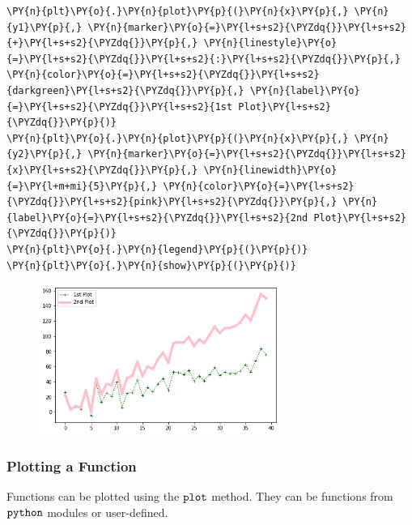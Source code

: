 \begin{tcolorbox}[breakable, size=fbox, boxrule=1pt, pad at break*=1mm,colback=cellbackground, colframe=cellborder]
\begin{Verbatim}[commandchars=\\\{\}]
\PY{n}{plt}\PY{o}{.}\PY{n}{plot}\PY{p}{(}\PY{n}{x}\PY{p}{,} \PY{n}{y1}\PY{p}{,} \PY{n}{marker}\PY{o}{=}\PY{l+s+s2}{\PYZdq{}}\PY{l+s+s2}{+}\PY{l+s+s2}{\PYZdq{}}\PY{p}{,} \PY{n}{linestyle}\PY{o}{=}\PY{l+s+s2}{\PYZdq{}}\PY{l+s+s2}{:}\PY{l+s+s2}{\PYZdq{}}\PY{p}{,} \PY{n}{color}\PY{o}{=}\PY{l+s+s2}{\PYZdq{}}\PY{l+s+s2}{darkgreen}\PY{l+s+s2}{\PYZdq{}}\PY{p}{,} \PY{n}{label}\PY{o}{=}\PY{l+s+s2}{\PYZdq{}}\PY{l+s+s2}{1st Plot}\PY{l+s+s2}{\PYZdq{}}\PY{p}{)}
\PY{n}{plt}\PY{o}{.}\PY{n}{plot}\PY{p}{(}\PY{n}{x}\PY{p}{,} \PY{n}{y2}\PY{p}{,} \PY{n}{marker}\PY{o}{=}\PY{l+s+s2}{\PYZdq{}}\PY{l+s+s2}{x}\PY{l+s+s2}{\PYZdq{}}\PY{p}{,} \PY{n}{linewidth}\PY{o}{=}\PY{l+m+mi}{5}\PY{p}{,} \PY{n}{color}\PY{o}{=}\PY{l+s+s2}{\PYZdq{}}\PY{l+s+s2}{pink}\PY{l+s+s2}{\PYZdq{}}\PY{p}{,} \PY{n}{label}\PY{o}{=}\PY{l+s+s2}{\PYZdq{}}\PY{l+s+s2}{2nd Plot}\PY{l+s+s2}{\PYZdq{}}\PY{p}{)}
\PY{n}{plt}\PY{o}{.}\PY{n}{legend}\PY{p}{(}\PY{p}{)}
\PY{n}{plt}\PY{o}{.}\PY{n}{show}\PY{p}{(}\PY{p}{)}
\end{Verbatim}
\end{tcolorbox}

\begin{figure}[h]
	\centering
	\includegraphics[width=0.7\textwidth]{figures/matplotlib_15_0.png}
\end{figure}

\subsubsection{Plotting a Function}\label{plotting-a-function}

Functions can be plotted using the \(\tt{plot}\) method. They can be
functions from \(\tt{python}\) modules or user-defined.

